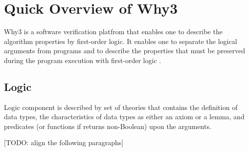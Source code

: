 \documentclass[a4paper,12pt]{article}
\begin{document}
\begin{algorithm}
\caption{$ \initBF (G,s) $}
\begin{algorithmic}[1]
\ENDFOR
{}
\end{algorithmic}
\end{algorithm}

\begin{algorithm}
\caption{$ \relaxBF (u,v,l) $}
\begin{algorithmic}[1]
\ENDIF
\end{algorithmic}
\end{algorithm}

\begin{algorithm}
\caption{$ \mainBF (G,s,l) $}\label{alg:bf}
\begin{algorithmic}[1]
\ENDFOR
\ENDFOR
{}
\ENDIF
\ENDFOR
{}
\end{algorithmic}
\end{algorithm}


\section{Quick Overview of Why3}

Why3 is a software verification platfrom that enables one to describe the algorithm properties by first-order logic. It enables one to separate the logical arguments from programs and to describe the properties that must be preserved during the program execution with first-order logic \cite{why3}.




\subsection{Logic}

Logic component is described by set of theories that contains the definition of data types, the characteristics of data types as either an axiom or a lemma, and predicates (or functions if returns non-Boolean) upon the arguments.

[TODO: align the following paragraphs]
\end{document}
